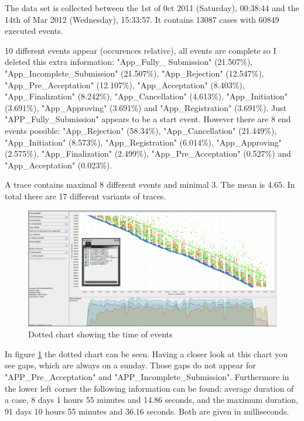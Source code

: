 The data set is collected between the 1st of 0ct 2011 (Saturday), 00:38:44 and the 14th of Mar 2012 (Wednesday), 15:33:57. It contains 13087 cases with 60849 executed events.

10 different events appear (occurences relative), all events are complete so I deleted this extra information: "App\_Fully\_ Submission" (21.507\%), "App\_Incomplete\_Submission" (21.507\%), "App\_Rejection" (12.547\%), "App\_Pre\_Acceptation" (12.107\%), "App\_Acceptation" (8.403\%), "App\_Finalization" (8.242\%), "App\_Cancellation" (4.613\%), "App\_Initiation" (3.691\%), "App\_Approving" (3.691\%) and "App\_Registration" (3.691\%). Just "APP\_Fully\_Submission" appears to be a start event. However there are 8 end events possible: "App\_Rejection" (58.34\%), "App\_Cancellation" (21.449\%), "App\_Initiation" (8.573\%), "App\_Registration" (6.014\%), "App\_Approving" (2.575\%), "App\_Finalization" (2.499\%), "App\_Pre\_Acceptation" (0.527\%) and "App\_Acceptation" (0.023\%).


A trace contains maximal 8 different events and minimal 3. The mean is 4.65. In total there are 17 different variants of traces. 


\begin{figure}[!htbp]
\centering
\includegraphics[height = 0.2\textheight]{AppData.PNG}
\caption{Dotted chart showing the time of events}
\label{fig:AppTimeFlow}
\end{figure}

In figure \ref{fig:AppTimeFlow} the dotted chart can be seen. Having a closer look at this chart you see gaps, which are always on a sunday. Those gaps do not appear for "APP\_Pre\_Acceptation" and "APP\_Incomplete\_Submission". Furthermore in the lower left corner the following information can be found: average duration of a case, 8 days 1 hours 55 minutes and 14.86 seconds, and the maximum duration, 91 days 10 hours 55 minutes and 36.16 seconds. Both are given in milliseconds.


